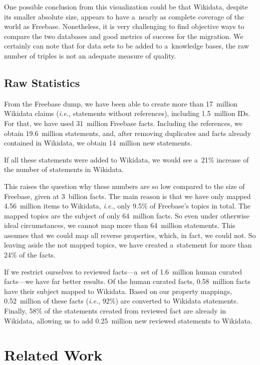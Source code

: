 \documentclass{sig-alternate-2013}
\begin{document}
One possible conclusion from this visualization could be that Wikidata,
despite its smaller absolute size, appears to have
a~nearly as complete coverage of the world as Freebase.
Nonetheless, it is very challenging to find objective ways to compare the two databases
and good metrics of success for the migration.
We certainly can note that for data sets to be added to a~knowledge bases,
the raw number of triples is not an adequate measure of quality.

\subsection{Raw Statistics}

From the Freebase dump, we have been able to create more than 17~million Wikidata claims
(\emph{i.e.}, statements without references), including 1.5~million IDs.
For that, we have used 31~million Freebase facts.
Including the references, we obtain 19.6~million statements, and, after removing duplicates
and facts already contained in Wikidata, we obtain 14~million new statements.

If all these statements were added to Wikidata,
we would see a~21\% increase of the number of statements in Wikidata.

This raises the question why these numbers are so low compared to the size of Freebase, given at
3~billion facts.
The main reason is that we have only mapped 4.56~million items to Wikidata,
\emph{i.e.}, only 9.5\% of Freebase's topics in total.
The mapped topics are the subject of only 64~million facts.
So even under otherwise ideal circumstances, we cannot map more than 64~million statements.
This assumes that we could map all reverse properties, which, in fact, we could not.
So leaving aside the not mapped topics, we have created a~statement for more than 24\% of the facts.

If we restrict ourselves to reviewed facts---a~set of
1.6~million human curated facts---we have far better results.
Of the human curated facts, 0.58~million facts have their subject mapped to Wikidata.
Based on our property mappings, 0.52~million of these facts
(\emph{i.e.}, 92\%) are converted to Wikidata statements.
Finally, 58\% of the statements created from reviewed fact are already in Wikidata,
allowing us to add 0.25~million new reviewed statements to Wikidata.

\section{Related Work}\label{sec:related-work}
\end{document}
